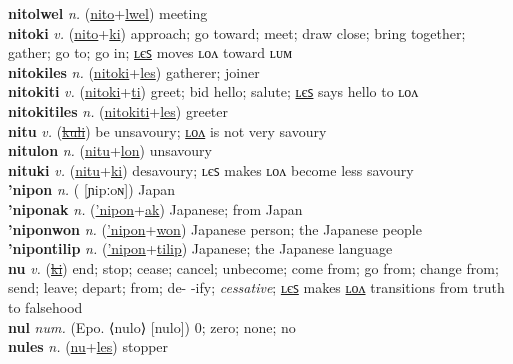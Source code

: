 \textbf{nitolwel} \textit{n.} (\hyperref[nito]{nito}+\hyperref[lwel]{lwel})
meeting \label{nitolwel} \\
\textbf{nitoki} \textit{v.} (\hyperref[nito]{nito}+\hyperref[ki]{ki})
approach; go toward; meet; draw close; bring together; gather; go to; go in; \hyperref[nitokiles]{ʟєꜱ} moves ʟᴏᴧ toward ʟᴜᴍ \label{nitoki} \\
\textbf{nitokiles} \textit{n.} (\hyperref[nitoki]{nitoki}+\hyperref[les]{les})
gatherer; joiner \label{nitokiles} \\
\textbf{nitokiti} \textit{v.} (\hyperref[nitoki]{nitoki}+\hyperref[ti]{ti})
greet; bid hello; salute; \hyperref[nitokitiles]{ʟєꜱ} says hello to ʟᴏᴧ \label{nitokiti} \\
\textbf{nitokitiles} \textit{n.} (\hyperref[nitokiti]{nitokiti}+\hyperref[les]{les})
greeter \label{nitokitiles} \\
\textbf{nitu} \textit{v.} (\hyperref[kuli]{\sout{kuli}})
be unsavoury; \hyperref[nitulon]{ʟᴏᴧ} is not very savoury \label{nitu} \\
\textbf{nitulon} \textit{n.} (\hyperref[nitu]{nitu}+\hyperref[lon]{lon})
unsavoury \label{nitulon} \\
\textbf{nituki} \textit{v.} (\hyperref[nitu]{nitu}+\hyperref[ki]{ki})
desavoury; ʟєꜱ makes ʟᴏᴧ become less savoury \label{nituki} \\
\textbf{'nipon} \textit{n.} ( [ɲipːoɴ])
Japan \label{'nipon} \\
\textbf{'niponak} \textit{n.} (\hyperref['nipon]{'nipon}+\hyperref[ak]{ak})
Japanese; from Japan \label{'niponak} \\
\textbf{'niponwon} \textit{n.} (\hyperref['nipon]{'nipon}+\hyperref[won]{won})
Japanese person; the Japanese people \label{'niponwon} \\
\textbf{'nipontilip} \textit{n.} (\hyperref['nipon]{'nipon}+\hyperref[tilip]{tilip})
Japanese; the Japanese language \label{'nipontilip} \\
\textbf{nu} \textit{v.} (\hyperref[ki]{\sout{ki}})
end; stop; cease; cancel; unbecome; come from; go from; change from; send; leave; depart; from; de- -ify; \textit{cessative}; \hyperref[nules]{ʟєꜱ} makes \hyperref[nulon]{ʟᴏᴧ} transitions from truth to falsehood \label{nu} \\
\textbf{nul} \textit{num.} (Epo. ⟨nulo⟩ [nulo])
0; zero; none; no \label{nul} \\
\textbf{nules} \textit{n.} (\hyperref[nu]{nu}+\hyperref[les]{les})
stopper \label{nules} \\
